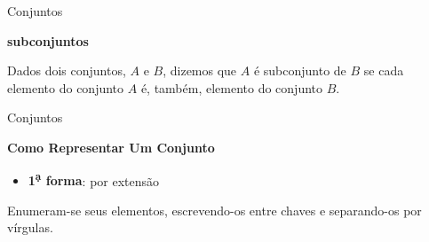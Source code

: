 \documentclass[11pt, openright, a4paper, brazil, english, french, spanish, bibjustif, xcolor=table,aspectratio=169]{beamer}
\begin{document}
     \begin{frame}[t]{Conjuntos}

          \medskip

          \textbf{subconjuntos}

          \medskip

               \begin{minipage}{\columnwidth}

               Dados dois conjuntos, $A$ e $B$, dizemos que $A$ é subconjunto de $B$ se cada elemento do conjunto $A$ é, também, elemento do conjunto $B$.

               
               
               
               
               
               
               

               \end{minipage}



     \end{frame}

     \begin{frame}[t]{Conjuntos}

          \medskip

          \textbf{Como Representar Um Conjunto}

          \medskip

               \begin{minipage}{\columnwidth}

\begin{itemize}

\item \textbf{1\textsuperscript{\d a} forma}: por extensão

\end{itemize}

Enumeram-se seus elementos, escrevendo-os entre chaves e separando-os por vírgulas.

               \end{minipage}

     \end{frame}
\end{document}
